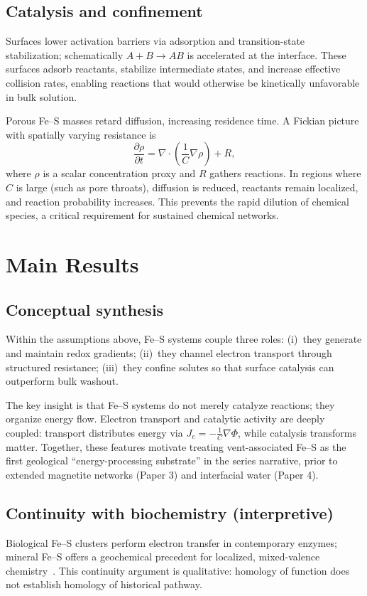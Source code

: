 \documentclass[11pt,a4paper]{article}
\begin{document}
\subsection{Catalysis and confinement}
Surfaces lower activation barriers via adsorption and transition-state stabilization; schematically $A+B \rightarrow AB$ is accelerated at the interface. These surfaces adsorb reactants, stabilize intermediate states, and increase effective collision rates, enabling reactions that would otherwise be kinetically unfavorable in bulk solution.

Porous Fe--S masses retard diffusion, increasing residence time. A Fickian picture with spatially varying resistance is
\begin{equation}
\frac{\partial \rho}{\partial t} = \nabla\cdot\left(\frac{1}{C}\nabla\rho\right) + R,
\end{equation}
where $\rho$ is a scalar concentration proxy and $R$ gathers reactions. In regions where $C$ is large (such as pore throats), diffusion is reduced, reactants remain localized, and reaction probability increases. This prevents the rapid dilution of chemical species, a critical requirement for sustained chemical networks.

\section{Main Results}

\subsection{Conceptual synthesis}
Within the assumptions above, Fe--S systems couple three roles: (i)~they generate and maintain redox gradients; (ii)~they channel electron transport through structured resistance; (iii)~they confine solutes so that surface catalysis can outperform bulk washout.

The key insight is that Fe--S systems do not merely catalyze reactions; they organize energy flow. Electron transport and catalytic activity are deeply coupled: transport distributes energy via $J_e = -\frac{1}{C} \nabla \Phi$, while catalysis transforms matter. Together, these features motivate treating vent-associated Fe--S as the first geological ``energy-processing substrate'' in the series narrative, prior to extended magnetite networks (Paper 3) and interfacial water (Paper 4).

\subsection{Continuity with biochemistry (interpretive)}
Biological Fe--S clusters perform electron transfer in contemporary enzymes; mineral Fe--S offers a geochemical precedent for localized, mixed-valence chemistry~\cite{Russell1994}. This continuity argument is qualitative: homology of function does not establish homology of historical pathway.
\end{document}
